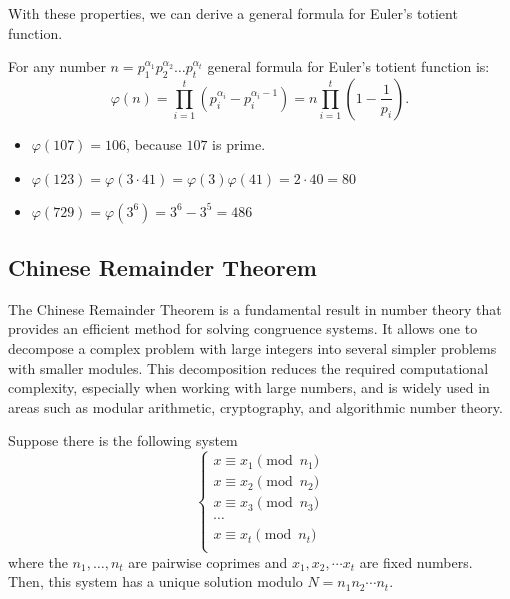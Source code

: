 \documentclass[../lecture-notes-148x210.tex]{subfiles}
\begin{document}
With these properties, we can derive a general formula for Euler's totient function. 

\begin{corollary}
    For any number $n = p_{1}^{\alpha_1}p_{2}^{\alpha_2} \dots p_{t}^{\alpha_t}$ general formula for Euler's totient function is: 
    \begin{equation*}
        \varphi(n) = \prod_{i = 1}^{t} \left( p_{i}^{\alpha_i} - p_{i}^{\alpha_i - 1} \right) = n \prod_{i = 1}^{t} \left( 1 - \frac{1}{p_i} \right).
    \end{equation*}
\end{corollary}

\begin{example}
    \hfill

    \begin{itemize}
        \item $\varphi(107) = 106$, because $107$ is prime.
        \item $\varphi(123) = \varphi(3 \cdot 41) = \varphi(3)\varphi(41) = 2 \cdot 40 = 80$
        \item $\varphi(729) = \varphi(3^6) = 3^6 - 3^5 = 486$
    \end{itemize}
\end{example}

\subsection{Chinese Remainder Theorem}
The Chinese Remainder Theorem \cite[chapter 10]{Cohen_Frey_2005} is a fundamental result in number theory
that provides an efficient method for solving congruence systems. It allows one to
decompose a complex problem with large integers into several simpler 
problems with smaller modules. This decomposition reduces the required computational 
complexity, especially when working with large numbers, and is widely used 
in areas such as modular arithmetic, cryptography, and algorithmic number theory. 

\begin{theorem}  \label{th:chinese_remainder_theorem}
    Suppose there is the following system
    \begin{equation*}    
        \begin{cases}
            x \equiv x_1 \pmod{n_1} \\
            x \equiv x_2 \pmod{n_2} \\
            x \equiv x_3 \pmod{n_3} \\
            \cdots \\
            x \equiv x_t \pmod{n_t} \\
        \end{cases}
    \end{equation*}
    where the $n_1,\dots,n_t$ are pairwise coprimes and $x_1, x_2, \cdots x_t$ are fixed numbers. 
    Then, this system has a unique solution modulo $N = n_1n_2 \cdots n_t$.
\end{theorem}
\end{document}
